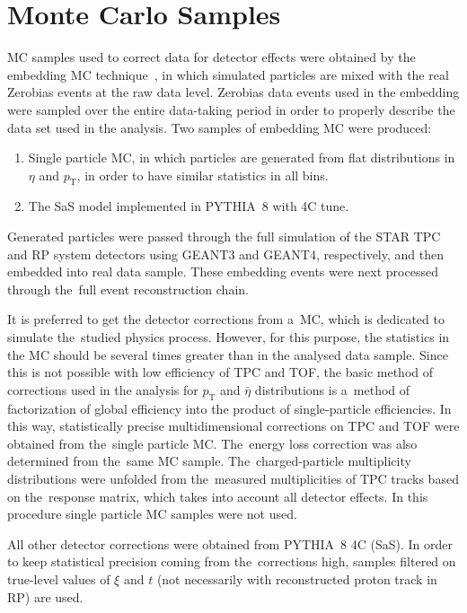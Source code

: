 \chapter{Monte Carlo Samples }\label{section:star_mc}
\ac{MC} samples used to correct data for detector effects were obtained by the embedding \ac{MC} technique~\cite{STAR:tpc}, in which  simulated particles are mixed with the real Zerobias events at the raw data level. Zerobias data events used in the embedding were sampled over the entire data-taking period in order to properly describe the data set used in the analysis.  Two samples of embedding MC were produced:
\begin{enumerate}
	\item Single particle \ac{MC}, in which particles are generated from flat distributions in $\eta$ and $p_\textrm{T}$, in order to have similar statistics in all bins.
	\item The \ac{SaS} model implemented in PYTHIA~8 with 4C tune. 
\end{enumerate}
Generated particles were passed through the full simulation of the STAR TPC and RP system detectors using GEANT3 and GEANT4, respectively, and then embedded into real data sample. %
These embedding events were next processed through the~full event reconstruction  chain. 

It is preferred to get the detector corrections from a~MC, which is dedicated to simulate the~studied  physics process. However, for this purpose, the statistics in the MC should be several times greater  than in the analysed data sample. Since this is not possible with  low efficiency of TPC and TOF, the basic method of corrections used in the analysis for $p_\textrm{T}$ and $\bar{\eta}$ distributions is a~method of factorization of global efficiency into the product of single-particle efficiencies. In this way, statistically precise multidimensional corrections on TPC and TOF were obtained from the~single particle MC. The~energy loss correction was also determined from the~same \ac{MC} sample. The~charged-particle multiplicity distributions were unfolded from the~measured multiplicities of TPC tracks based on the~response matrix, which takes into account  all detector effects.
In this procedure single particle MC samples were not used.

All other detector corrections were obtained from PYTHIA~8 4C (\ac{SaS}).    In order to keep statistical precision coming
from the~corrections high, samples filtered on true-level values of $\xi$ and $t$ (not necessarily with reconstructed proton track in RP) are used.  

